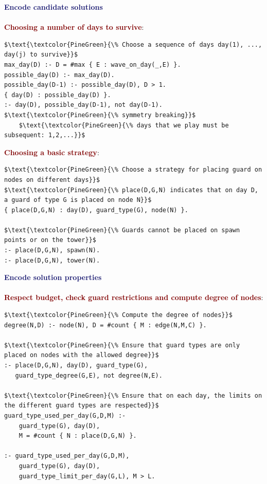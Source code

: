 \newpage 

{\Huge \textbf{\textcolor{MidnightBlue}{Encode candidate solutions}}}  \\
\\

{\Large \textbf{\textcolor{Maroon}{Choosing a number of days to survive}}:} 
\begin{lstlisting}
$\text{\textcolor{PineGreen}{\% Choose a sequence of days day(1), ..., day(j) to survive}}$
max_day(D) :- D = #max { E : wave_on_day(_,E) }.
possible_day(D) :- max_day(D).
possible_day(D-1) :- possible_day(D), D > 1.
{ day(D) : possible_day(D) }.
:- day(D), possible_day(D-1), not day(D-1). $\text{\textcolor{PineGreen}{\% symmetry breaking}}$ 
    $\text{\textcolor{PineGreen}{\% days that we play must be subsequent: 1,2,...}}$
\end{lstlisting}

\vspace{0.40cm}

{\Large \textbf{\textcolor{Maroon}{Choosing a basic strategy}}:} 
\begin{lstlisting}
$\text{\textcolor{PineGreen}{\% Choose a strategy for placing guard on nodes on different days}}$
$\text{\textcolor{PineGreen}{\% place(D,G,N) indicates that on day D, a guard of type G is placed on node N}}$
{ place(D,G,N) : day(D), guard_type(G), node(N) }.

$\text{\textcolor{PineGreen}{\% Guards cannot be placed on spawn points or on the tower}}$
:- place(D,G,N), spawn(N).
:- place(D,G,N), tower(N).
\end{lstlisting}

\vspace{1cm}

{\Huge \textbf{\textcolor{MidnightBlue}{Encode solution properties}}}  \\
\\
{\Large \textbf{\textcolor{Maroon}{Respect budget, check guard restrictions and compute degree of nodes}}:}
\begin{lstlisting}
$\text{\textcolor{PineGreen}{\% Compute the degree of nodes}}$
degree(N,D) :- node(N), D = #count { M : edge(N,M,C) }.

$\text{\textcolor{PineGreen}{\% Ensure that guard types are only placed on nodes with the allowed degree}}$
:- place(D,G,N), day(D), guard_type(G),
   guard_type_degree(G,E), not degree(N,E).

$\text{\textcolor{PineGreen}{\% Ensure that on each day, the limits on the different guard types are respected}}$
guard_type_used_per_day(G,D,M) :- 
    guard_type(G), day(D),
    M = #count { N : place(D,G,N) }.
   
:- guard_type_used_per_day(G,D,M), 
    guard_type(G), day(D),
    guard_type_limit_per_day(G,L), M > L.
\end{lstlisting}

